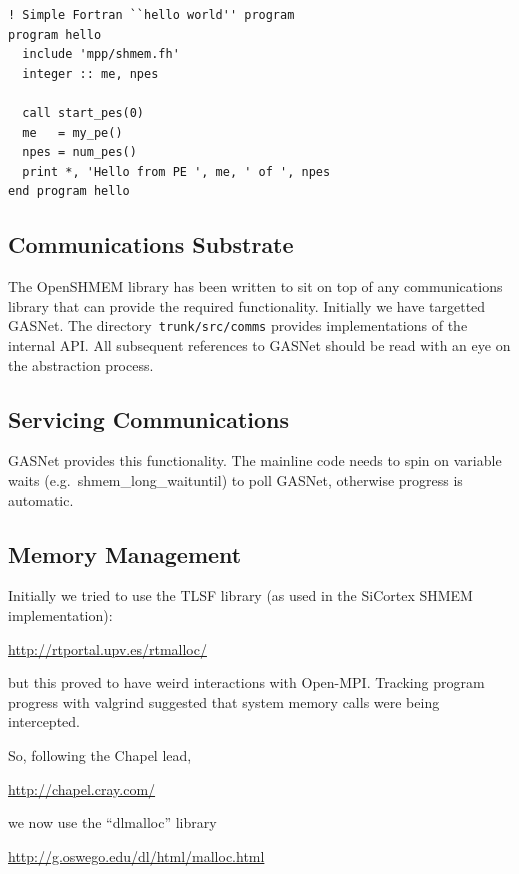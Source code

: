 \documentclass[english]{article}
\begin{document}
\vspace{0.1in}
\begin{minipage}{\linewidth}
\begin{lstlisting}
! Simple Fortran ``hello world'' program
program hello
  include 'mpp/shmem.fh'
  integer :: me, npes

  call start_pes(0)
  me   = my_pe()
  npes = num_pes()
  print *, 'Hello from PE ', me, ' of ', npes
end program hello
\end{lstlisting}
\end{minipage}

\subsection{Communications Substrate}

The OpenSHMEM library has been written to sit on top of any
communications library that can provide the required
functionality. Initially we have targetted GASNet. The
directory\texttt{ trunk/src/comms} provides implementations of the
internal API. All subsequent references to GASNet should be read with
an eye on the abstraction process.

\subsection{Servicing Communications}

GASNet provides this functionality. The mainline code needs to spin on
variable waits (e.g.\ shmem\_long\_waituntil) to poll GASNet,
otherwise progress is automatic.

\subsection{Memory Management}

Initially we tried to use the TLSF library (as used in the SiCortex
SHMEM implementation):

\url{http://rtportal.upv.es/rtmalloc/}

but this proved to have weird interactions with Open-MPI. Tracking
program progress with valgrind suggested that system memory calls were
being intercepted.

So, following the Chapel lead,

\url{http://chapel.cray.com/}

we now use the ``dlmalloc'' library

\url{http://g.oswego.edu/dl/html/malloc.html}
\end{document}
